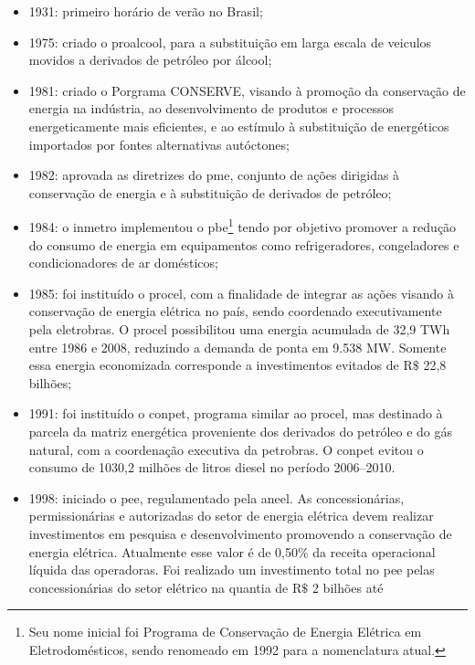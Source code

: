 \begin{itemize}
\item 1931: primeiro horário de verão no Brasil;
\item 1975: criado o \gls{proalcool}, para a substituição em larga escala de
veiculos movidos a derivados de petróleo por álcool; 
\item 1981: criado o Porgrama CONSERVE, visando à promoção da conservação de
energia na indústria, ao desenvolvimento de produtos e processos energeticamente
mais eficientes, e ao estímulo à substituição de energéticos importados por
fontes alternativas autóctones;
\item 1982: aprovada as diretrizes do \gls{pme}, conjunto de ações dirigidas à
conservação de energia e à substituição de derivados de petróleo;
\item 1984: o \gls{inmetro} implementou o \gls{pbe}\footnote{Seu nome inicial
foi Programa de Conservação de Energia Elétrica em Eletrodomésticos, sendo
renomeado em 1992 para a nomenclatura atual.} tendo por objetivo promover a
redução do consumo de energia em equipamentos como refrigeradores, congeladores e condicionadores
de ar domésticos;
\item 1985: foi instituído o \gls{procel}, com a finalidade de integrar as
ações visando à conservação de energia elétrica no país, sendo coordenado
executivamente pela \acrshort{eletrobras}. O \gls{procel} possibilitou uma energia acumulada de 32,9 TWh entre
1986 e 2008, reduzindo a demanda de ponta em 9.538 MW. Somente essa energia
economizada corresponde a investimentos evitados de $\text{R\$}$ 22,8 bilhões; 
\item 1991: foi instituído o \gls{conpet}, programa similar ao \gls{procel}, mas
destinado à parcela da matriz energética proveniente dos derivados do petróleo e
do gás natural, com a coordenação executiva da \acrshort{petrobras}. 
O \gls{conpet} evitou o consumo de 1030,2 milhões de litros diesel no período
2006--2010. 
\item 1998: iniciado o \gls{pee}, regulamentado pela \gls{aneel}. As concessionárias,
permissionárias e autorizadas do setor de energia elétrica devem realizar
investimentos em pesquisa e desenvolvimento promovendo a conservação de energia elétrica. 
Atualmente esse valor é de 0,50\% da receita operacional líquida das operadoras. 
Foi realizado um investimento total no \gls{pee} 
pelas concessionárias do setor elétrico na quantia de $\text{R\$}$ 2 bilhões até

\end{itemize}
